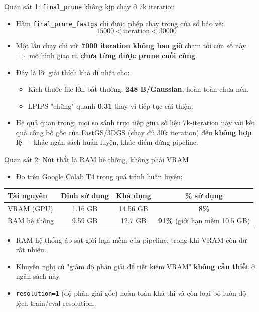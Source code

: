 
\begin{frame}{Quan sát 1: \texttt{final\_prune} không kịp chạy ở 7k iteration}
\begin{itemize}
    \item Hàm \texttt{final\_prune\_fastgs} chỉ được phép chạy trong cửa sổ bảo vệ:
    \[
        15000 < \text{iteration} < 30000
    \]
    \item Một lần chạy chỉ với \textbf{7000 iteration} \textbf{không bao giờ} chạm tới cửa sổ này $\Rightarrow$ mô hình giao ra \textbf{chưa từng được prune cuối cùng}.
    \item Đây là lời giải thích khả dĩ nhất cho:
    \begin{itemize}
        \item Kích thước file lớn bất thường: \textbf{248 B/Gaussian}, hoàn toàn chưa nén.
        \item LPIPS "chững" quanh \textbf{0.31} thay vì tiếp tục cải thiện.
    \end{itemize}
    \item \alert{Hệ quả quan trọng:} mọi so sánh trực tiếp giữa số liệu 7k-iteration này với kết quả công bố gốc của FastGS/3DGS (chạy đủ 30k iteration) đều \textbf{không hợp lệ} — khác ngân sách huấn luyện, khác điểm dừng pipeline.
\end{itemize}
\end{frame}

\begin{frame}{Quan sát 2: Nút thắt là RAM hệ thống, không phải VRAM}
\begin{itemize}
    \item Đo trên Google Colab T4 trong quá trình huấn luyện:
\end{itemize}
\footnotesize
\begin{table}[]
\centering
\begin{tabular}{lccc}
\toprule
Tài nguyên & Đỉnh sử dụng & Khả dụng & \% sử dụng \\
\midrule
VRAM (GPU) & 1.16 GB & 14.56 GB & \textbf{8\%} \\
RAM hệ thống & 9.59 GB & 12.7 GB & \textbf{91\%} (giới hạn mềm 10.5 GB) \\
\bottomrule
\end{tabular}
\end{table}
\normalsize
\begin{itemize}
    \item RAM hệ thống áp sát giới hạn mềm của pipeline, trong khi VRAM còn dư rất nhiều.
    \item Khuyến nghị cũ "giảm độ phân giải để tiết kiệm VRAM" \textbf{không cần thiết} ở ngân sách này.
    \item \texttt{resolution=1} (độ phân giải gốc) hoàn toàn khả thi và còn loại bỏ luôn độ lệch train/eval resolution.
\end{itemize}
\end{frame}

